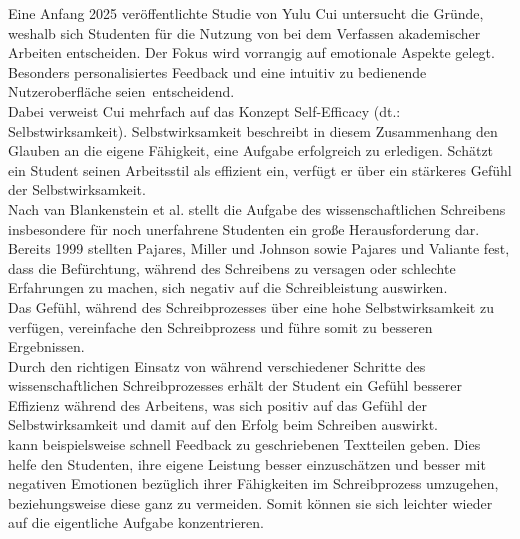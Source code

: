 \documentclass[../main.tex]{subfiles}
\begin{document}
Eine Anfang 2025 veröffentlichte Studie von Yulu Cui untersucht die Gründe, weshalb sich Studenten für die Nutzung von 
 bei dem Verfassen akademischer Arbeiten entscheiden. Der Fokus wird vorrangig auf emotionale 
Aspekte gelegt. Besonders personalisiertes Feedback und eine intuitiv zu bedienende Nutzeroberfläche \mbox{seien entscheidend.\cite{influencingUsingAi}} \\
Dabei verweist Cui mehrfach auf das Konzept Self-Efficacy (dt.: Selbstwirksamkeit). Selbstwirksamkeit beschreibt in diesem Zusammenhang den Glauben 
an die eigene Fähigkeit, eine Aufgabe erfolgreich zu erledigen. Schätzt ein Student seinen Arbeitsstil als effizient ein, 
verfügt er über ein stärkeres Gefühl der Selbstwirksamkeit. \cite{influencingUsingAi,SelfEfficacyBeliefs}\\
Nach van Blankenstein et al. stellt die Aufgabe des wissenschaftlichen Schreibens insbesondere für noch unerfahrene Studenten 
ein große Herausforderung dar. Bereits 1999 stellten Pajares, Miller und Johnson sowie Pajares und Valiante fest,
dass die Befürchtung, während des Schreibens zu versagen oder schlechte Erfahrungen zu machen, sich negativ auf die Schreibleistung 
auswirken. \cite{writingSelfBeliefs,writingSelfBeliefsMiddleSchool}\\
Das Gefühl, während des Schreibprozesses über eine hohe Selbstwirksamkeit zu verfügen, vereinfache den 
Schreibprozess und führe somit zu besseren Ergebnissen. \cite{SelfEfficacyBeliefs} \\
Durch den richtigen Einsatz von  während verschiedener Schritte des wissenschaftlichen Schreibprozesses erhält der Student
ein Gefühl besserer Effizienz während des Arbeitens, was sich positiv auf das Gefühl der Selbstwirksamkeit und damit auf den Erfolg
beim Schreiben auswirkt.\\
 kann beispielsweise schnell Feedback zu geschriebenen Textteilen geben. Dies helfe den Studenten, ihre eigene 
Leistung besser einzuschätzen und besser mit negativen Emotionen bezüglich ihrer Fähigkeiten im Schreibprozess umzugehen, beziehungsweise diese ganz zu vermeiden. Somit 
können sie sich leichter wieder auf die eigentliche Aufgabe konzentrieren. \cite{SelfEfficacyBeliefs} 
\end{document}
